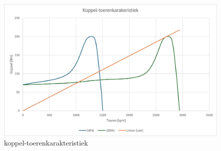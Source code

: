 \begin{enumerate}
        \begin{figure}[h]
            \centering
            \includegraphics[scale=0.13]{2e.jpg}
            \caption{koppel-toerenkarakteristiek}
        \end{figure}

\end{enumerate}